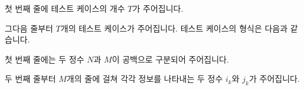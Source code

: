 첫 번째 줄에 테스트 케이스의 개수 $T$가 주어집니다.

그다음 줄부터 $T$개의 테스트 케이스가 주어집니다. 테스트 케이스의 형식은 다음과 같습니다.

첫 번째 줄에는 두 정수 $N$과 $M$이 공백으로 구분되어 주어집니다.

두 번째 줄부터 $M$개의 줄에 걸쳐 각각 정보를 나타내는 두 정수 $i_k$와 $j_k$가 주어집니다.